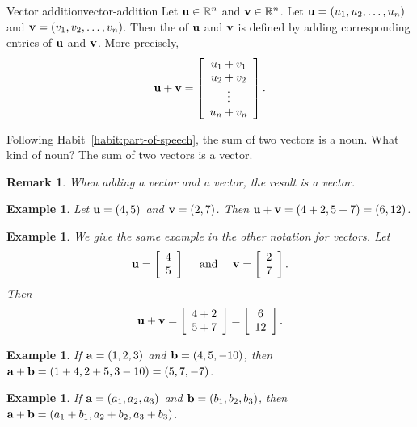 \documentclass{book}
\newcounter{ekcounter}%
\theoremstyle{ekimcustom}
\newtheorem{example}[ekcounter]{Example}
\newtheorem{remark}[ekcounter]{Remark}
\newcommand\defn[1]{{\color{blue}{\bf #1}}}
\begin{document}

\begin{bdefinition}{Vector addition}{vector-addition}
Let ${\bf u} \in \mathbb{R}^n$ and ${\bf v} \in \mathbb{R}^n$. Let ${\bf u} = (u_1,u_2,\dots,u_n)$ and ${\bf v}=(v_1,v_2,\dots,v_n)$. Then the \defn{sum} of ${\bf u}$ and ${\bf v}$ is defined by adding corresponding entries of ${\bf u}$ and ${\bf v}$. More precisely,
\[ {\bf u} + {\bf v} = \left[ \begin{array}{c}
u_1 + v_1 \\
u_2 + v_2 \\
\vdots\\
u_n + v_n
\end{array}\right].\]
\end{bdefinition}
Following Habit~\ref{habit:part-of-speech}, the sum of two vectors is a noun. What kind of noun? The sum of two vectors is a vector.
\begin{remark}\label{remark:vector-addition-is-vector}
When adding a vector and a vector, the result is a vector.
\end{remark}
\begin{example}
Let ${\bf u} = (4,5)$ and ${\bf v} = (2,7)$. Then ${\bf u}+{\bf v} = (4+2,5+7)=(6,12)$.
\end{example}
\begin{example}
We give the same example in the other notation for vectors. Let 
\[{\bf u} = \left[\begin{array}{c}4\\5\end{array}\right] \quad\text{ and } \quad{\bf v} = \left[\begin{array}{c}2\\7\end{array}\right].\]
Then 
\[
{\bf u}+{\bf v} =
\left[\begin{array}{c}4+2\\5+7\end{array}\right]
=
\left[\begin{array}{c}6\\12\end{array}\right].
\]
\end{example}
\begin{example}\label{example:va-r3}
If ${\bf a} = (1,2,3)$ and ${\bf b}=(4,5,-10)$, then ${\bf a}+{\bf b} = (1+4,2+5,3-10) = (5,7,-7)$.
\end{example}
\begin{example}\label{example:va-r3-generic}
If ${\bf a} = (a_1,a_2,a_3)$ and ${\bf b}=(b_1,b_2,b_3)$, then ${\bf a}+{\bf b} = (a_1+b_1,a_2+b_2,a_3+b_3)$.
\end{example}
\end{document}
